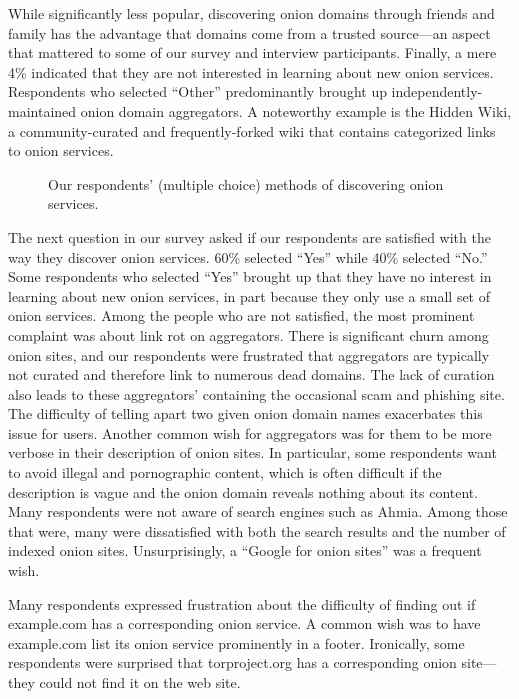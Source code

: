 While significantly less popular, discovering onion domains through friends and
family has the advantage that domains come from a trusted source---an aspect
that mattered to some of our survey and interview participants.  Finally, a mere
4\% indicated that they are not interested in learning about new onion services.
Respondents who selected ``Other'' predominantly brought up
independently-maintained onion domain aggregators.  A noteworthy example is the
Hidden Wiki, a community-curated and frequently-forked wiki that contains
categorized links to onion services.

\begin{figure}[t]
    \centering
    
    \caption{Our respondents' (multiple choice) methods of discovering onion
    services.}
    \label{fig:onion-discovery}
\end{figure}

The next question in our survey asked if our respondents are satisfied with the
way they discover onion services.  60\% selected ``Yes'' while 40\% selected
``No.'' Some respondents who selected ``Yes'' brought up that they have no
interest in learning about new onion services, in part because they only use a
small set of onion services.  Among the people who are not satisfied, the most
prominent complaint was about link rot on aggregators.  There is significant
churn among onion sites, and our respondents were frustrated that aggregators
are typically not curated and therefore link to numerous dead domains.  The lack
of curation also leads to these aggregators' containing the occasional scam and
phishing site.  The difficulty of telling apart two given onion domain names
exacerbates this issue for users.  Another common wish for aggregators was for
them to be more verbose in their description of onion sites.  In particular,
some respondents want to avoid illegal and pornographic content, which is often
difficult if the description is vague and the onion domain reveals nothing about
its content.  Many respondents were not aware of search engines such as Ahmia.
Among those that were, many were dissatisfied with both the search results and
the number of indexed onion sites.  Unsurprisingly, a ``Google for onion sites''
was a frequent wish.

Many respondents expressed frustration about the difficulty of finding out if
example.com has a corresponding onion service.  A common wish was to have
example.com list its onion service prominently in a footer.  Ironically, some
respondents were surprised that torproject.org has a corresponding onion
site---they could not find it on the web site.

